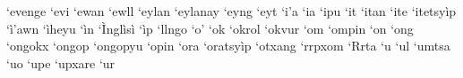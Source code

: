`evenge\hspace{2mm}
`evi\hspace{2mm}
`ewan\hspace{2mm}
`ewll\hspace{2mm}
`eylan\hspace{2mm}
`eylanay\hspace{2mm}
`eyng\hspace{2mm}
`eyt\hspace{2mm}
`i'a\hspace{2mm}
`ia\hspace{2mm}
`ipu\hspace{2mm}
`it\hspace{2mm}
`itan\hspace{2mm}
`ite\hspace{2mm}
`itetsyìp\hspace{2mm}
`ì'awn\hspace{2mm}
`ìheyu\hspace{2mm}
`ìn\hspace{2mm}
`Ìnglìsì\hspace{2mm}
`ìp\hspace{2mm}
`llngo\hspace{2mm}
`o'\hspace{2mm}
`ok\hspace{2mm}
`okrol\hspace{2mm}
`okvur\hspace{2mm}
`om\hspace{2mm}
`ompin\hspace{2mm}
`on\hspace{2mm}
`ong\hspace{2mm}
`ongokx\hspace{2mm}
`ongop\hspace{2mm}
`ongopyu\hspace{2mm}
`opin\hspace{2mm}
`ora\hspace{2mm}
`oratsyìp\hspace{2mm}
`otxang\hspace{2mm}
`rrpxom\hspace{2mm}
`Rrta\hspace{2mm}
`u\hspace{2mm}
`ul\hspace{2mm}
`umtsa\hspace{2mm}
`uo\hspace{2mm}
`upe\hspace{2mm}
`upxare\hspace{2mm}
`ur\hspace{2mm}

